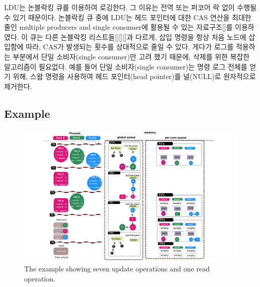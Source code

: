 LDU는  논블락킹 큐를 이용하여 로깅한다. 그 이유는 전역 또는 퍼코어 락 없이 수행될 수 
있기 때문이다. 
논블락킹 큐 중에 LDU는 헤드 포인터에 대한 CAS 연산을 최대한 줄인 multiple producers
and single consumer에 활용될 수 있는 자료구조[]를 이용하였다.
이 큐는 다른 논블락킹 리스트들[][][]과 다르게, 삽입 명령을 항상 처음 노드에 삽입함에
따라, CAS가 발생되는 횟수를 상대적으로 줄일 수 있다.
게다가 로그를 적용하는 부분에서 단일 소비자(single consumer)만 고려 했기 때문에, 
삭제를 위한 복잡한 알고리즘이 필요없다. 
예를 들어 단일 소비자(single consumer)는 명령 로그 전체를 얻기 위해, 스왑 명령을 사용하여
 헤드 포인터(head pointer)를 널(NULL)로 원자적으로 제거한다. 


\subsection{Example}
\begin{figure}[h]
  \begin{center}
     \includegraphics[width=1.0\textwidth,height=0.4\textheight]{fig/basic_gldu}
  \end{center}
  \caption{The \LDU example showing seven update operations and one read
  operation.}
  \label{fig:basic}
\end{figure}


